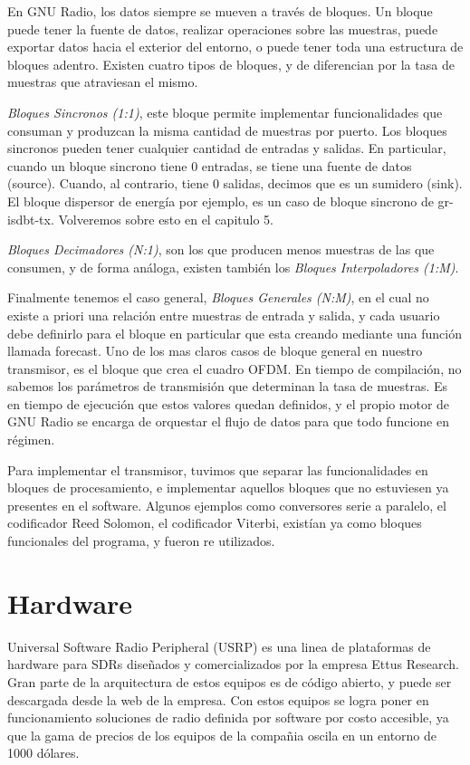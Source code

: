 En GNU Radio, los datos siempre se mueven a través de bloques. Un bloque puede tener la fuente de datos, realizar operaciones sobre las muestras, puede exportar datos hacia el exterior del entorno, o puede tener toda una estructura de bloques adentro. 
Existen cuatro tipos de bloques, y de diferencian por la tasa de muestras que atraviesan el mismo. 

\textit{Bloques Sincronos (1:1)}, este bloque permite implementar funcionalidades que consuman y produzcan la misma cantidad de muestras por puerto. Los bloques sincronos pueden tener cualquier cantidad de entradas y salidas. En particular, cuando un bloque sincrono tiene 0 entradas, se tiene una fuente de datos (source). Cuando, al contrario, tiene 0 salidas, decimos que es un sumidero (sink). El bloque dispersor de energía por ejemplo, es un caso de bloque sincrono de gr-isdbt-tx. Volveremos sobre esto en el capitulo 5.

\textit{Bloques Decimadores (N:1)}, son los que producen menos muestras de las que consumen, y de forma análoga, existen también los \textit{Bloques Interpoladores (1:M)}.

Finalmente tenemos el caso general, \textit{Bloques Generales (N:M)}, en el cual no existe a priori una relación entre muestras de entrada y salida, y cada usuario debe definirlo para el bloque en particular que esta creando mediante una función llamada forecast. Uno de los mas claros casos de bloque general en nuestro transmisor, es el bloque que crea el cuadro OFDM. En tiempo de compilación, no sabemos los parámetros de transmisión que determinan la tasa de muestras. Es en tiempo de ejecución que estos valores quedan definidos, y el propio motor de GNU Radio se encarga de orquestar el flujo de datos para que todo funcione en régimen.

Para implementar el transmisor, tuvimos que separar las funcionalidades en bloques de procesamiento, e implementar aquellos bloques que no estuviesen ya presentes en el software. Algunos ejemplos como conversores serie a paralelo, el codificador Reed Solomon, el codificador Viterbi, existían ya como bloques funcionales del programa, y fueron re utilizados. 

\section{Hardware}
Universal Software Radio Peripheral (USRP) es una linea de plataformas de hardware para SDRs diseñados y comercializados por la empresa Ettus Research. Gran parte de la arquitectura de estos equipos es de código abierto, y puede ser descargada desde la web de la empresa. Con estos equipos se logra poner en funcionamiento soluciones de radio definida por software por costo accesible, ya que la gama de precios de los equipos de la compañia oscila en un entorno de 1000 dólares. 

